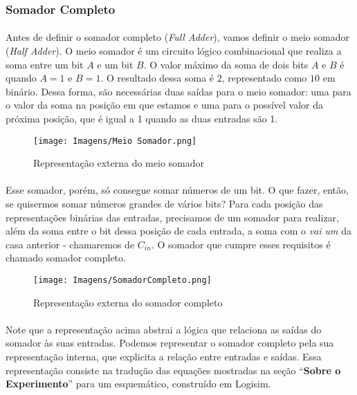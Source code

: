 \documentclass[a4paper,12pt]{article}
\begin{document}
\subsubsection{Somador Completo}
\paragraph{}
Antes de definir o somador completo (\textit{Full Adder}), vamos definir o meio somador (\textit{Half Adder}). O meio somador é um circuito lógico combinacional que realiza a soma entre um bit $A$ e um bit $B$. O valor máximo da soma de dois bits $A$ e $B$ é quando $A = 1$ e $B = 1$. O resultado dessa soma é $2$, representado como $10$ em binário. Dessa forma, são necessárias duas saídas para o meio somador: uma para o valor da soma na posição em que estamos e uma para o possível valor da próxima posição, que é igual a 1 quando as duas entradas são 1.

\begin{figure}[H]
    \centering
    \texttt{[image: Imagens/Meio Somador.png]}
    \caption{Representação externa do meio somador}
\end{figure}

\paragraph{}
Esse somador, porém, só consegue somar números de um bit. O que fazer, então, se quisermos somar números grandes de vários bits? Para cada posição das representações binárias das entradas, precisamos de um somador para realizar, além da soma entre o bit dessa posição de cada entrada, a soma com o \textit{vai um} da casa anterior - chamaremos de $C_{in}$. O somador que cumpre esses requisitos é chamado somador completo.

\begin{figure}[H]
    \centering
    \texttt{[image: Imagens/SomadorCompleto.png]}
    \caption{Representação externa do somador completo}
    \label{fig:somador_externa}
\end{figure}

\paragraph{}
Note que a representação acima abstrai a lógica que relaciona as saídas do somador às suas entradas. Podemos representar o somador completo pela sua representação interna, que explicita a relação entre entradas e saídas. Essa representação consiste na tradução das equações mostradas na seção ``\textbf{Sobre o Experimento}'' para um esquemático, construído em Logisim.
\end{document}
